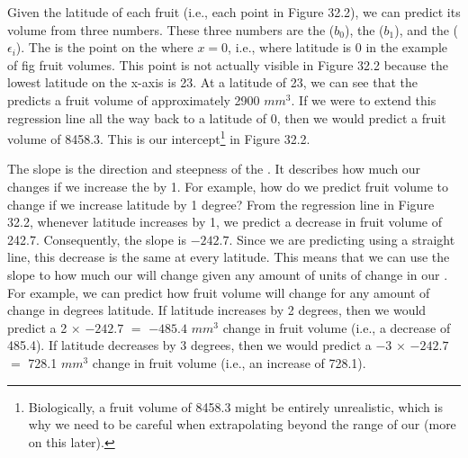 \documentclass[
  openany]{krantz}
\begin{document}
Given the latitude of each fruit (i.e., each point in Figure 32.2), we can predict its volume from three numbers.
These three numbers are the  (\(b_{0}\)), the  (\(b_{1}\)), and the  (\(\epsilon_{i}\)).
The  is the point on the  where \(x = 0\), i.e., where latitude is 0 in the example of fig fruit volumes.
This point is not actually visible in Figure 32.2 because the lowest latitude on the x-axis is 23.
At a latitude of 23, we can see that the  predicts a fruit volume of approximately 2900 \(mm^{3}\).
If we were to extend this regression line all the way back to a latitude of 0, then we would predict a fruit volume of 8458.3.
This is our intercept\footnote{Biologically, a fruit volume of 8458.3 might be entirely unrealistic, which is why we need to be careful when extrapolating beyond the range of our  (more on this later).} in Figure 32.2.

The slope is the direction and steepness of the .
It describes how much our  changes if we increase the  by 1.
For example, how do we predict fruit volume to change if we increase latitude by 1 degree?
From the regression line in Figure 32.2, whenever latitude increases by 1, we predict a decrease in fruit volume of 242.7.
Consequently, the slope is \(-242.7\).
Since we are predicting using a straight line, this decrease is the same at every latitude.
This means that we can use the slope to  how much our  will change given any amount of units of change in our .
For example, we can predict how fruit volume will change for any amount of change in degrees latitude.
If latitude increases by 2 degrees, then we would predict a 2 \(\times\) \(-242.7\) \(=\) \(-485.4\) \(mm^{3}\) change in fruit volume (i.e., a decrease of 485.4).
If latitude decreases by 3 degrees, then we would predict a \(-3\) \(\times\) \(-242.7\) \(=\) 728.1 \(mm^{3}\) change in fruit volume (i.e., an increase of 728.1).
\end{document}
